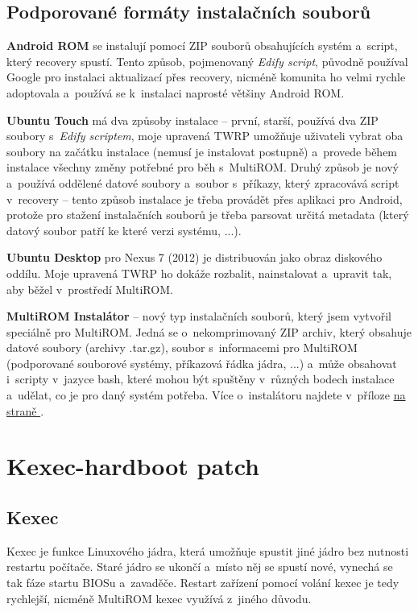 \documentclass[12pt, a4paper, oneside]{article}
\newcommand{\B}{\textbf} %
\newcommand{\It}{\textit}  %
\newcommand*{\attref}[1]{\hyperref[{#1}]{\uv{\nameref*{#1}} na straně \pageref{#1}}}
\begin{document}
\subsection {Podporované formáty instalačních souborů}
\B{Android ROM} se instalují pomocí ZIP souborů obsahujících systém a~script, který recovery spustí. Tento způsob, pojmenovaný \It{Edify script}, původně používal Google pro instalaci aktualizací přes recovery, nicméně komunita ho velmi rychle adoptovala a~používá se k~instalaci naprosté většiny Android ROM.

\B{Ubuntu Touch} má dva způsoby instalace -- první, starší, používá dva ZIP soubory s~\It{Edify scriptem}, moje upravená TWRP umožňuje uživateli vybrat oba soubory na začátku instalace (nemusí je instalovat postupně) a~provede během instalace všechny změny potřebné pro běh s~MultiROM. Druhý způsob je nový a~používá oddělené datové soubory a~soubor s~příkazy, který zpracovává script v~recovery -- tento způsob instalace je třeba provádět přes aplikaci pro Android, protože pro stažení instalačních souborů je třeba parsovat určitá metadata (který datový soubor patří ke které verzi systému, ...).

\B{Ubuntu Desktop} pro Nexus 7 (2012) je distribuován jako obraz diskového oddílu. Moje upravená TWRP ho dokáže rozbalit, nainstalovat a~upravit tak, aby běžel v~prostředí MultiROM. 

\B{MultiROM Instalátor} -- nový typ instalačních souborů, který jsem vytvořil speciálně pro MultiROM. Jedná se o~nekomprimovaný ZIP archiv, který obsahuje datové soubory (archivy .tar.gz), soubor s~informacemi pro MultiROM (podporované souborové systémy, příkazová řádka jádra, ...) a~může obsahovat i~scripty v~jazyce bash, které mohou být spuštěny v~různých bodech instalace a~udělat, co je pro daný systém potřeba. Více o~instalátoru najdete v~příloze \attref{sec:installer}.

\newpage
\section {Kexec-hardboot patch}
\subsection{Kexec}
Kexec je funkce Linuxového jádra, která umožňuje spustit jiné jádro bez nutnosti restartu počítače. Staré jádro se ukončí a~místo něj se spustí nové, vynechá se tak fáze startu BIOSu a~zavaděče. Restart zařízení pomocí volání kexec je tedy rychlejší, nicméně MultiROM kexec využívá z~jiného důvodu.
\end{document}

